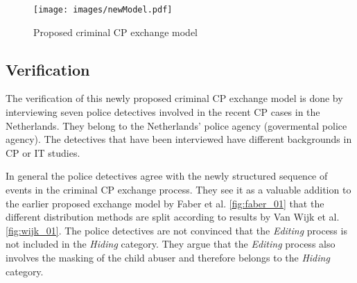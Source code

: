 \documentclass{sig-alternate-br}
\begin{document}
\begin{figure*}[ht]
\centering
\texttt{[image: images/newModel.pdf]}
\caption{Proposed criminal CP exchange model}
\label{fig:newModel}
\end{figure*}

\subsection{Verification}
The verification of this newly proposed criminal CP exchange model is done by interviewing seven police detectives involved in the recent CP cases in the Netherlands. They belong to the Netherlands' police agency (govermental police agency). The detectives that have been interviewed have different backgrounds in CP or IT studies.

In general the police detectives agree with the newly structured sequence of events in the criminal CP exchange process. They see it as a valuable addition to the earlier proposed exchange model by Faber et al. \ref{fig:faber_01} that the different distribution methods are split according to results by Van Wijk et al. \ref{fig:wijk_01}. The police detectives are not convinced that the \textit{Editing} process is not included in the \textit{Hiding} category. They argue that the \textit{Editing} process also involves the masking of the child abuser and therefore belongs to the \textit{Hiding} category.
\end{document}
